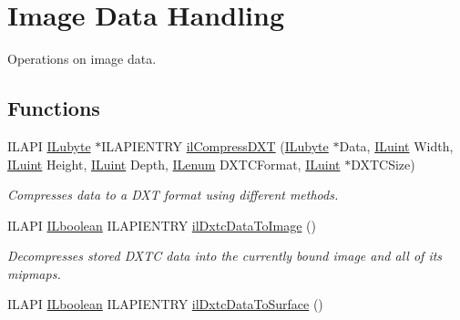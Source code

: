 \hypertarget{group__data}{\section{Image Data Handling}
\label{group__data}
}


Operations on image data.  


\subsection*{Functions}
\begin{DoxyCompactItemize}
\item 
I\+L\+A\+P\+I \hyperlink{group__il__types_ga057357939bc5a12e8061715453568519}{I\+Lubyte} $\ast$I\+L\+A\+P\+I\+E\+N\+T\+R\+Y \hyperlink{group__data_ga016b03ccbf86f6ba37d6c24b3357f9d1}{il\+Compress\+D\+X\+T} (\hyperlink{group__il__types_ga057357939bc5a12e8061715453568519}{I\+Lubyte} $\ast$Data, \hyperlink{group__il__types_gaff8e86a1072c8d7cfe387fb87c6ed8e1}{I\+Luint} Width, \hyperlink{group__il__types_gaff8e86a1072c8d7cfe387fb87c6ed8e1}{I\+Luint} Height, \hyperlink{group__il__types_gaff8e86a1072c8d7cfe387fb87c6ed8e1}{I\+Luint} Depth, \hyperlink{group__il__types_ga62ca73445716183ef42b1f3906a45ed0}{I\+Lenum} D\+X\+T\+C\+Format, \hyperlink{group__il__types_gaff8e86a1072c8d7cfe387fb87c6ed8e1}{I\+Luint} $\ast$D\+X\+T\+C\+Size)
\begin{DoxyCompactList}\small\item\em Compresses data to a D\+X\+T format using different methods. \end{DoxyCompactList}\item 
\hypertarget{group__data_ga8faac0b5b4f410b903b1bc4b825fc345}{I\+L\+A\+P\+I \hyperlink{group__il__types_gaa6aa7c95cfdc06b4d8601ef832b7bb0a}{I\+Lboolean} I\+L\+A\+P\+I\+E\+N\+T\+R\+Y \hyperlink{group__data_ga8faac0b5b4f410b903b1bc4b825fc345}{il\+Dxtc\+Data\+To\+Image} ()}\label{group__data_ga8faac0b5b4f410b903b1bc4b825fc345}

\begin{DoxyCompactList}\small\item\em Decompresses stored D\+X\+T\+C data into the currently bound image and all of its mipmaps. \end{DoxyCompactList}\item 
\hypertarget{group__data_ga1357342a2f78514311614044bc6adee2}{I\+L\+A\+P\+I \hyperlink{group__il__types_gaa6aa7c95cfdc06b4d8601ef832b7bb0a}{I\+Lboolean} I\+L\+A\+P\+I\+E\+N\+T\+R\+Y \hyperlink{group__data_ga1357342a2f78514311614044bc6adee2}{il\+Dxtc\+Data\+To\+Surface} ()}\label{group__data_ga1357342a2f78514311614044bc6adee2}


\end{DoxyCompactItemize}
